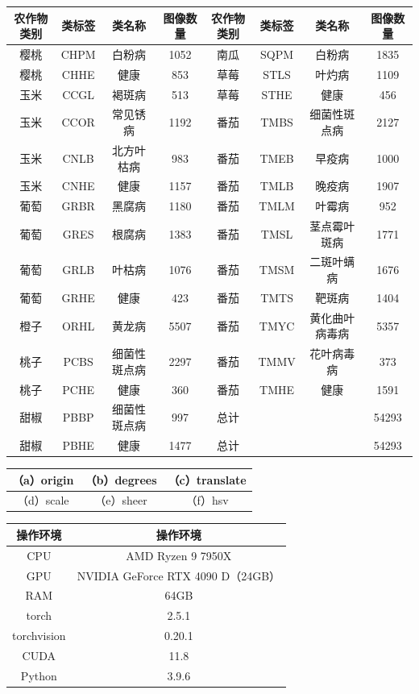\documentclass[12pt, a4paper, twoside]{ctexart}
\begin{document}
\begin{table}[htbp]
\centering
\begin{tabular}{|c|c|c|c|c|c|c|c|}
\hline
农作物类别 & 类标签 & 类名称 & 图像数量 & 农作物类别 & 类标签 & 类名称 & 图像数量 \\
\hline
樱桃 & CHPM & 白粉病 & 1052 & 南瓜 & SQPM & 白粉病 & 1835 \\
\hline
樱桃 & CHHE & 健康 & 853 & 草莓 & STLS & 叶灼病 & 1109 \\
\hline
玉米 & CCGL & 褐斑病 & 513 & 草莓 & STHE & 健康 & 456 \\
\hline
玉米 & CCOR & 常见锈病 & 1192 & 番茄 & TMBS & 细菌性斑点病 & 2127 \\
\hline
玉米 & CNLB & 北方叶枯病 & 983 & 番茄 & TMEB & 早疫病 & 1000 \\
\hline
玉米 & CNHE & 健康 & 1157 & 番茄 & TMLB & 晚疫病 & 1907 \\
\hline
葡萄 & GRBR & 黑腐病 & 1180 & 番茄 & TMLM & 叶霉病 & 952 \\
\hline
葡萄 & GRES & 根腐病 & 1383 & 番茄 & TMSL & 茎点霉叶斑病 & 1771 \\
\hline
葡萄 & GRLB & 叶枯病 & 1076 & 番茄 & TMSM & 二斑叶螨病 & 1676 \\
\hline
葡萄 & GRHE & 健康 & 423 & 番茄 & TMTS & 靶斑病 & 1404 \\
\hline
橙子 & ORHL & 黄龙病 & 5507 & 番茄 & TMYC & 黄化曲叶病毒病 & 5357 \\
\hline
桃子 & PCBS & 细菌性斑点病 & 2297 & 番茄 & TMMV & 花叶病毒病 & 373 \\
\hline
桃子 & PCHE & 健康 & 360 & 番茄 & TMHE & 健康 & 1591 \\
\hline
甜椒 & PBBP & 细菌性斑点病 & 997 & 总计 &  &  & 54293 \\
\hline
甜椒 & PBHE & 健康 & 1477 & 总计 &  &  & 54293 \\
\hline
\end{tabular}
\end{table}

\begin{table}[htbp]
\centering
\begin{tabular}{|c|c|c|}
\hline
（a）origin & （b）degrees & （c）translate \\
\hline
（d）scale & （e）sheer & （f）hsv \\
\hline
\end{tabular}
\end{table}

\begin{table}[htbp]
\centering
\begin{tabular}{|c|c|}
\hline
操作环境 & 操作环境 \\
\hline
CPU & AMD Ryzen 9 7950X \\
\hline
GPU & NVIDIA GeForce RTX 4090 D（24GB） \\
\hline
RAM & 64GB \\
\hline
torch & 2.5.1 \\
\hline
torchvision & 0.20.1 \\
\hline
CUDA & 11.8 \\
\hline
Python & 3.9.6 \\
\hline
\end{tabular}
\end{table}
\end{document}
